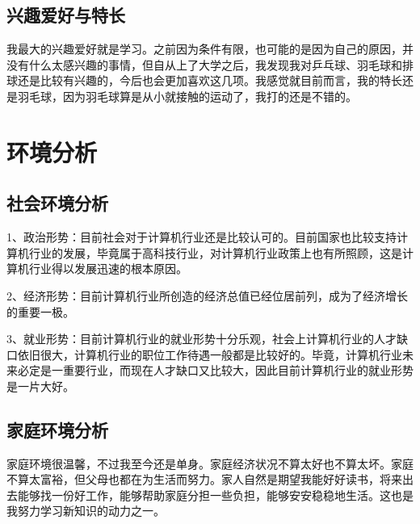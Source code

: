 \documentclass{article}
\begin{document}
\subsection{兴趣爱好与特长}
我最大的兴趣爱好就是学习。之前因为条件有限，也可能的是因为自己的原因，并没有什么太感兴趣的事情，但自从上了大学之后，我发现我对乒乓球、羽毛球和排球还是比较有兴趣的，今后也会更加喜欢这几项。我感觉就目前而言，我的特长还是羽毛球，因为羽毛球算是从小就接触的运动了，我打的还是不错的。\par
\section{环境分析}
\par
\subsection{社会环境分析}
1、政治形势：目前社会对于计算机行业还是比较认可的。目前国家也比较支持计算机行业的发展，毕竟属于高科技行业，对计算机行业政策上也有所照顾，这是计算机行业得以发展迅速的根本原因。\par 
2、经济形势：目前计算机行业所创造的经济总值已经位居前列，成为了经济增长的重要一极。\par 
3、就业形势：目前计算机行业的就业形势十分乐观，社会上计算机行业的人才缺口依旧很大，计算机行业的职位工作待遇一般都是比较好的。毕竟，计算机行业未来必定是一重要行业，而现在人才缺口又比较大，因此目前计算机行业的就业形势是一片大好。\par
\subsection{家庭环境分析}
家庭环境很温馨，不过我至今还是单身。家庭经济状况不算太好也不算太坏。家庭不算太富裕，但父母也都在为生活而努力。家人自然是期望我能好好读书，将来出去能够找一份好工作，能够帮助家庭分担一些负担，能够安安稳稳地生活。这也是我努力学习新知识的动力之一。\par
\end{document}

